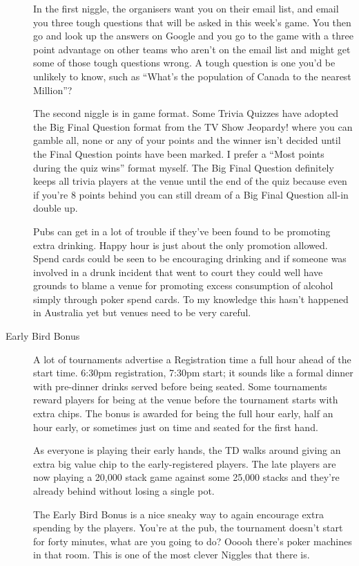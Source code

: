 \begin{description}
In the first niggle, the organisers want you on their email list, and
email you three tough questions that will be asked in this week's
game. You then go and look up the answers on Google and you go to the
game with a three point advantage on other teams who aren't on the
email list and might get some of those tough questions wrong. A tough
question is one you'd be unlikely to know, such as ``What's the
population of Canada to the nearest Million''?

The second niggle is in game format. Some Trivia Quizzes have adopted
the Big Final Question format from the TV Show Jeopardy! where you can
gamble all, none or any of your points and the winner isn't decided
until the Final Question points have been marked. I prefer a ``Most
points during the quiz wins'' format myself. The Big Final Question
definitely keeps all trivia players at the venue until the end of the
quiz because even if you're 8 points behind you can still dream of a
Big Final Question all-in double up.

Pubs can get in a lot of trouble if they've been found to be
promoting extra drinking. Happy hour is just about the only
promotion allowed. Spend cards could be seen to be encouraging drinking
and if someone was involved in a drunk incident that went
to court they could well have grounds to blame a venue for
promoting excess consumption of alcohol simply through poker
spend cards. To my knowledge this hasn't happened in Australia yet
but venues need to be very careful.

\item[Early Bird Bonus] A lot of tournaments advertise a Registration
time a full hour ahead of the start time. 6:30pm registration, 7:30pm
start; it sounds like a formal dinner with pre-dinner drinks served
before being seated. Some tournaments reward players for being
at the venue before the tournament starts with extra
chips. The bonus is awarded for being the full hour early, half an
hour early, or sometimes just on time and seated for the first hand.

As everyone is playing their early hands, the TD walks around
giving an extra big value chip to the early-registered players. The
late players are now playing a 20,000 stack game against some
25,000 stacks and they're already behind without losing a single pot.

The Early Bird Bonus is a nice sneaky way to again encourage extra
spending by the players. You're at the pub, the tournament doesn't
start for forty minutes, what are you going to do? Ooooh there's poker
machines in that room. This is one of the most clever Niggles that
there is.


\end{description}
